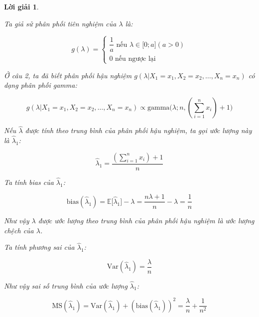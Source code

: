 \documentclass[14pt, a4paper]{article}
\theoremstyle{sltheorem}
\theoremstyle{soltheorem}
\newtheorem*{loigiai}{Lời giải}
\begin{document}
\begin{loigiai}
\begin{enumerate}
\begin{itemize}
            Ta giả sử phân phối tiên nghiệm của $\lambda$ là:

            \begin{equation*}
                g(\lambda) = \begin{cases}
                    \dfrac{1}{a} \text{ nếu } \lambda \in \lbrack 0; a\rbrack (a > 0) \\
                    0 \text{ nếu ngược lại}
                \end{cases}
            \end{equation*}

            Ở câu 2, ta đã biết phân phối hậu nghiệm $g(\lambda \vert X_1 =x_1, X_2=x_2, \dots, X_n=x_n)$ có dạng phân phối gamma:

            \begin{equation*}
                g(\lambda \vert X_1 =x_1, X_2=x_2, \dots, X_n=x_n) \propto \text{gamma}\big(\lambda; n, (\sum_{i=1}^n x_i) + 1\big)
            \end{equation*}

            Nếu $\hat{\lambda}$ được tính theo trung bình của phân phối hậu nghiệm,
            ta gọi ước lượng này là $\hat{\lambda}_1$:

            \begin{equation*}
                \hat{\lambda}_1 = \dfrac{(\sum_{i=1}^n x_i) + 1}{n}
            \end{equation*}

            Ta tính bias của $\hat{\lambda}_1$:

            \begin{equation*}
                \text{bias}(\hat{\lambda}_1) = \mathbb{E} \lbrack \hat{\lambda}_1 \rbrack - \lambda = \dfrac{n\lambda + 1}{n} - \lambda = \dfrac{1}{n}
            \end{equation*}

            Như vậy $\lambda$ được ước lượng theo trung bình của phân phối hậu nghiệm là ước lượng chệch của $\lambda$.

            Ta tính phương sai của $\hat{\lambda}_1$:
            
            \begin{equation*}
                \text{Var}(\hat{\lambda}_1) = \dfrac{\lambda}{n}
            \end{equation*}

            Như vậy sai số trung bình của ước lượng $\hat{\lambda}_1$:

            \begin{equation*}
                \text{MS}(\hat{\lambda}_1) = \text{Var}(\hat{\lambda}_1) + (\text{bias}(\hat{\lambda}_1))^2 = \dfrac{\lambda}{n} + \dfrac{1}{n^2}
            \end{equation*}


\end{itemize}
\end{enumerate}
\end{loigiai}
\end{document}
